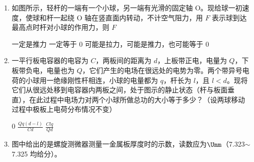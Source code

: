 \documentclass[\gkver]{gaokaozhenti}
\begin{document}
\begin{enumerate}
\item
如图所示，轻杆的一端有一个小球，另一端有光滑的固定轴 O。现给球一初速度，使球和杆一起绕 O 轴在竖直面内转动，不计空气阻力，用 $F$ 表示球到达最高点时杆对小球的作用力，则 $F$


{一定是推力}
{一定等于 0}
{可能是拉力，可能是推力，也可能等于 0}

\item
一平行板电容器的电容为 $C$，两板间的距离为 $d$，上板带正电，电量为 $Q$，下板带负电，电量也为 $Q$，它们产生的电场在很远处的电势为零。两个带异号电荷的小球用一绝缘刚性杆相连，小球的电量都为 $q$，杆长为 $l$，且 $l<d$。现将它们从很远处移到电容器内两板之间，处于图示的静止状态（杆与板面垂直），在此过程中电场力对两个小球所做总功的大小等于多少？（设两球移动过程中极板上电荷分布情况不变）


{$0$}
{$\frac{Qq(d-l)}{Cd}$}
{$\frac{Clq}{Qd}$}

\item
图中给出的是螺旋测微器测量一金属板厚度时的示数，读数应为$\Umm$（7.323$\sim$7.325 均给分）。


\end{enumerate}
\end{document}

